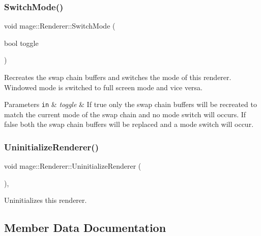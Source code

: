 \subsubsection{\texorpdfstring{Switch\+Mode()}{SwitchMode()}}
{\footnotesize\ttfamily void mage\+::\+Renderer\+::\+Switch\+Mode (\begin{DoxyParamCaption}\item[{bool}]{toggle }\end{DoxyParamCaption})}

Recreates the swap chain buffers and switches the mode of this renderer. Windowed mode is switched to full screen mode and vice versa.


\begin{DoxyParams}[1]{Parameters}
\mbox{\tt in}  & {\em toggle} & If {\ttfamily true} only the swap chain buffers will be recreated to match the current mode of the swap chain and no mode switch will occurs. If {\ttfamily false} both the swap chain buffers will be replaced and a mode switch will occur. \\
\hline
\end{DoxyParams}
\hypertarget{classmage_1_1_renderer_a28c76b49e51e49e58fdeb0b72b12f3b6}{}\label{classmage_1_1_renderer_a28c76b49e51e49e58fdeb0b72b12f3b6} 
\subsubsection{\texorpdfstring{Uninitialize\+Renderer()}{UninitializeRenderer()}}
{\footnotesize\ttfamily void mage\+::\+Renderer\+::\+Uninitialize\+Renderer (\begin{DoxyParamCaption}{ }\end{DoxyParamCaption})\hspace{0.3cm}{\ttfamily [private]}, {\ttfamily [noexcept]}}

Uninitializes this renderer. 

\subsection{Member Data Documentation}
\hypertarget{classmage_1_1_renderer_aecf4bcb70dc186b4f2083df38d1e4bc3}{}\label{classmage_1_1_renderer_aecf4bcb70dc186b4f2083df38d1e4bc3} 
